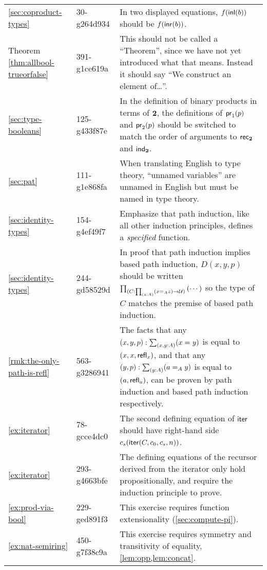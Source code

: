 \documentclass[
%
%
11pt %
]{article}
\begin{document}
\begin{longtable}{llp{10.5cm}}
  \cref{sec:coproduct-types}
  & 30-g264d934
  & In two displayed equations, $f({\mathsf{inl}}(b))$ should be $f({\mathsf{inr}}(b))$.\\
  Theorem \ref{thm:allbool-trueorfalse} %
  & 391-g1ce619a
  & This should not be called a ``Theorem'', since we have not yet introduced what that means.
  Instead it should say ``We construct an element of\dots''.\\
  \cref{sec:type-booleans}
  & 125-g433f87e
  & In the definition of binary products in terms of $\mathbf{2}$, the definitions of $\mathsf{pr}_{1}(p)$ and $\mathsf{pr}_{2}(p)$ should be switched to match the order of arguments to $\mathsf{rec}_{\mathbf{2}}$ and $\mathsf{ind}_{\mathbf{2}}$.\\
  \cref{sec:pat}
  & 111-g1e868fa
  & When translating English to type theory, ``unnamed variables'' are unnamed in English but must be named in type theory.\\
  \cref{sec:identity-types}
  & 154-g4ef49f7
  & Emphasize that path induction, like all other induction principles, defines a \emph{specified} function.\\
  \cref{sec:identity-types}
  & 244-gd58529d
  & In proof that path induction implies based path induction, $D(x,y,p)$ should be written $\prd{C : \prd{z:A} (\id[A]{x}{z}) \to \UU} \left( \cdots \right)$ so the type of $C$ matches the premise of based path induction. \\
  \cref{rmk:the-only-path-is-refl}
  & 563-g3286941
  & The facts that any $(x,y,p): \sm{x,y:A}(\id{x}{y})$ is equal to $(x,x,\mathsf{refl}_{x})$, and that any $(y,p):\sm{y:A}(\id[A]{a}{y})$ is equal to $(a,\mathsf{refl}_{a})$, can be proven by path induction and based path induction respectively.\\
  \cref{ex:iterator}
  & 78-gcce4dc0
  & The second defining equation of $\mathsf{iter}$ should have right-hand side $c_s(\mathsf{iter}(C,c_0,c_s,n))$.\\
  \cref{ex:iterator}
  & 293-g4663bfe
  & The defining equations of the recursor derived from the iterator only hold propositionally, and require the induction principle to prove.\\
  \cref{ex:prod-via-bool}
  & 229-ged891f3
  & This exercise requires function extensionality (\cref{sec:compute-pi}).\\
  \cref{ex:nat-semiring}
  & 450-g7f38c9a
  & This exercise requires symmetry and transitivity of equality, \cref{lem:opp,lem:concat}.\\

\end{longtable}
\end{document}
